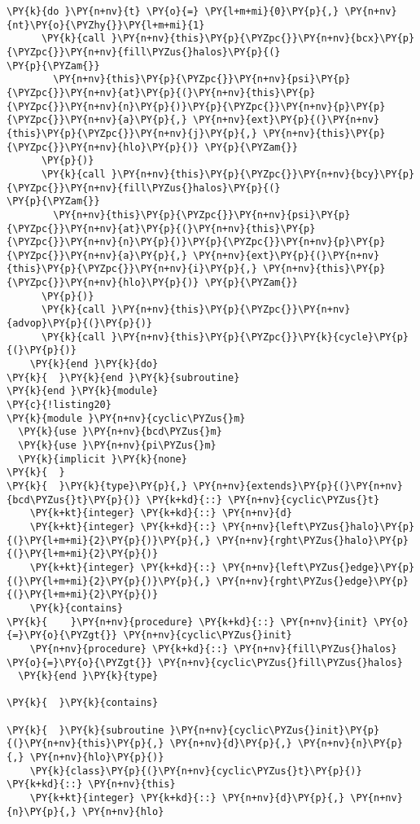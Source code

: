 \begin{Verbatim}[commandchars=\\\{\}]
    \PY{k}{do }\PY{n+nv}{t} \PY{o}{=} \PY{l+m+mi}{0}\PY{p}{,} \PY{n+nv}{nt}\PY{o}{\PYZhy{}}\PY{l+m+mi}{1} 
      \PY{k}{call }\PY{n+nv}{this}\PY{p}{\PYZpc{}}\PY{n+nv}{bcx}\PY{p}{\PYZpc{}}\PY{n+nv}{fill\PYZus{}halos}\PY{p}{(}                        \PY{p}{\PYZam{}}
        \PY{n+nv}{this}\PY{p}{\PYZpc{}}\PY{n+nv}{psi}\PY{p}{\PYZpc{}}\PY{n+nv}{at}\PY{p}{(}\PY{n+nv}{this}\PY{p}{\PYZpc{}}\PY{n+nv}{n}\PY{p}{)}\PY{p}{\PYZpc{}}\PY{n+nv}{p}\PY{p}{\PYZpc{}}\PY{n+nv}{a}\PY{p}{,} \PY{n+nv}{ext}\PY{p}{(}\PY{n+nv}{this}\PY{p}{\PYZpc{}}\PY{n+nv}{j}\PY{p}{,} \PY{n+nv}{this}\PY{p}{\PYZpc{}}\PY{n+nv}{hlo}\PY{p}{)} \PY{p}{\PYZam{}}
      \PY{p}{)}
      \PY{k}{call }\PY{n+nv}{this}\PY{p}{\PYZpc{}}\PY{n+nv}{bcy}\PY{p}{\PYZpc{}}\PY{n+nv}{fill\PYZus{}halos}\PY{p}{(}                        \PY{p}{\PYZam{}}
        \PY{n+nv}{this}\PY{p}{\PYZpc{}}\PY{n+nv}{psi}\PY{p}{\PYZpc{}}\PY{n+nv}{at}\PY{p}{(}\PY{n+nv}{this}\PY{p}{\PYZpc{}}\PY{n+nv}{n}\PY{p}{)}\PY{p}{\PYZpc{}}\PY{n+nv}{p}\PY{p}{\PYZpc{}}\PY{n+nv}{a}\PY{p}{,} \PY{n+nv}{ext}\PY{p}{(}\PY{n+nv}{this}\PY{p}{\PYZpc{}}\PY{n+nv}{i}\PY{p}{,} \PY{n+nv}{this}\PY{p}{\PYZpc{}}\PY{n+nv}{hlo}\PY{p}{)} \PY{p}{\PYZam{}}
      \PY{p}{)}
      \PY{k}{call }\PY{n+nv}{this}\PY{p}{\PYZpc{}}\PY{n+nv}{advop}\PY{p}{(}\PY{p}{)}
      \PY{k}{call }\PY{n+nv}{this}\PY{p}{\PYZpc{}}\PY{k}{cycle}\PY{p}{(}\PY{p}{)}
    \PY{k}{end }\PY{k}{do}
\PY{k}{  }\PY{k}{end }\PY{k}{subroutine}
\PY{k}{end }\PY{k}{module}
\PY{c}{!listing20}
\PY{k}{module }\PY{n+nv}{cyclic\PYZus{}m}
  \PY{k}{use }\PY{n+nv}{bcd\PYZus{}m}
  \PY{k}{use }\PY{n+nv}{pi\PYZus{}m}
  \PY{k}{implicit }\PY{k}{none}
\PY{k}{  }
\PY{k}{  }\PY{k}{type}\PY{p}{,} \PY{n+nv}{extends}\PY{p}{(}\PY{n+nv}{bcd\PYZus{}t}\PY{p}{)} \PY{k+kd}{::} \PY{n+nv}{cyclic\PYZus{}t}
    \PY{k+kt}{integer} \PY{k+kd}{::} \PY{n+nv}{d}
    \PY{k+kt}{integer} \PY{k+kd}{::} \PY{n+nv}{left\PYZus{}halo}\PY{p}{(}\PY{l+m+mi}{2}\PY{p}{)}\PY{p}{,} \PY{n+nv}{rght\PYZus{}halo}\PY{p}{(}\PY{l+m+mi}{2}\PY{p}{)} 
    \PY{k+kt}{integer} \PY{k+kd}{::} \PY{n+nv}{left\PYZus{}edge}\PY{p}{(}\PY{l+m+mi}{2}\PY{p}{)}\PY{p}{,} \PY{n+nv}{rght\PYZus{}edge}\PY{p}{(}\PY{l+m+mi}{2}\PY{p}{)} 
    \PY{k}{contains}
\PY{k}{    }\PY{n+nv}{procedure} \PY{k+kd}{::} \PY{n+nv}{init} \PY{o}{=}\PY{o}{\PYZgt{}} \PY{n+nv}{cyclic\PYZus{}init}
    \PY{n+nv}{procedure} \PY{k+kd}{::} \PY{n+nv}{fill\PYZus{}halos} \PY{o}{=}\PY{o}{\PYZgt{}} \PY{n+nv}{cyclic\PYZus{}fill\PYZus{}halos}
  \PY{k}{end }\PY{k}{type}

\PY{k}{  }\PY{k}{contains}

\PY{k}{  }\PY{k}{subroutine }\PY{n+nv}{cyclic\PYZus{}init}\PY{p}{(}\PY{n+nv}{this}\PY{p}{,} \PY{n+nv}{d}\PY{p}{,} \PY{n+nv}{n}\PY{p}{,} \PY{n+nv}{hlo}\PY{p}{)}
    \PY{k}{class}\PY{p}{(}\PY{n+nv}{cyclic\PYZus{}t}\PY{p}{)} \PY{k+kd}{::} \PY{n+nv}{this}
    \PY{k+kt}{integer} \PY{k+kd}{::} \PY{n+nv}{d}\PY{p}{,} \PY{n+nv}{n}\PY{p}{,} \PY{n+nv}{hlo}


\end{Verbatim}
